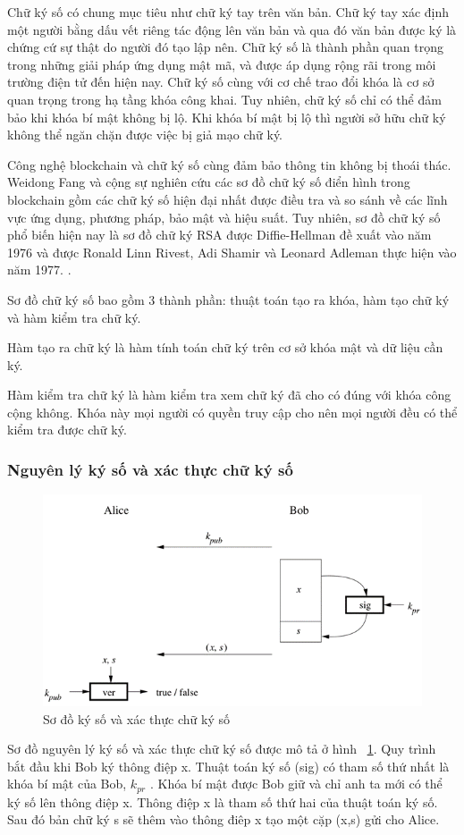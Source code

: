 Chữ ký số có chung mục tiêu như chữ ký tay trên văn bản. Chữ ký tay xác định một người bằng dấu vết riêng tác động lên văn bản và qua đó văn bản được ký là chứng cứ sự thật do người đó tạo lập nên. Chữ ký số là thành phần quan trọng trong những giải pháp ứng dụng mật mã, và được áp dụng rộng rãi trong môi trường điện tử đến hiện nay. Chữ ký số cùng với cơ chế trao đổi khóa là cơ sở quan trọng trong hạ tầng khóa công khai. Tuy nhiên, chữ ký số chỉ có thể đảm bảo khi khóa bí mật không bị lộ. Khi khóa bí mật bị lộ thì người sở hữu chữ ký không thể ngăn chặn được việc bị giả mạo chữ ký.

Công nghệ blockchain và chữ ký số cùng đảm bảo thông tin không bị thoái thác. Weidong Fang và cộng sự \cite{Fang2020} nghiên cứu các sơ đồ chữ ký số điển hình trong blockchain gồm các chữ ký số hiện đại nhất được điều tra và so sánh về các lĩnh vực ứng dụng, phương pháp, bảo mật và hiệu suất.
Tuy nhiên, sơ đồ chữ ký số phổ biến hiện nay là sơ đồ chữ ký RSA được Diffie-Hellman đề xuất vào năm 1976 và được Ronald Linn Rivest, Adi Shamir và Leonard Adleman thực hiện vào năm 1977. \cite{10.5555/1721909}. 

Sơ đồ chữ ký số bao gồm 3 thành phần: thuật toán tạo ra khóa, hàm tạo chữ ký và hàm kiểm tra chữ ký.

Hàm tạo ra chữ ký là hàm tính toán chữ ký trên cơ sở khóa mật và dữ liệu cần ký.

Hàm kiểm tra chữ ký là hàm kiểm tra xem chữ ký đã cho có đúng với khóa công cộng không. Khóa này mọi người có quyền truy cập cho nên mọi người đều có thể kiểm tra được chữ ký.

\subsubsection{Nguyên lý ký số và xác thực chữ ký số }

\begin{figure}[H]
\centering
\includegraphics[width=.9\linewidth]{img/dig_sig.png}
\caption{Sơ đồ ký số và xác thực chữ ký số}
\label{fig:dig_sig}
\end{figure}
Sơ đồ nguyên lý ký số và xác thực chữ ký số\cite{10.5555/1721909} được mô tả ở hình ~\ref{fig:dig_sig}.
Quy trình bắt đầu khi Bob ký thông điệp x. Thuật toán ký số (sig) có tham số thứ nhất là khóa bí mật của Bob, $k_{pr}$ . Khóa bí mật được Bob giữ và chỉ anh ta mới có thể ký số lên thông điệp x. Thông điệp x là tham số thứ hai của thuật toán ký số. Sau đó bản chữ ký s sẽ thêm vào thông điêp x tạo một cặp (x,s) gửi cho Alice.
 
